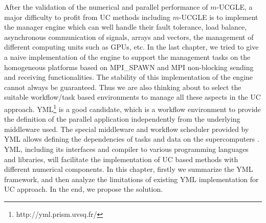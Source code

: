 \begin{displayquote}
	\textsf{After the validation of the numerical and parallel performance of $m$-UCGLE, a major difficulty to profit from UC methods including $m$-UCGLE is to implement the manager engine which can well handle their fault tolerance, load balance, asynchronous communication of signals, arrays and vectors, the management of different computing units such as GPUs, etc. In the last chapter, we tried to give a naive implementation of the engine to support the management tasks on the homogeneous platforms based on MPI\_SPAWN and MPI non-blocking sending and receiving functionalities. The stability of this implementation of the engine cannot always be guaranteed. Thus we are also thinking about to select the suitable workflow/task based environments to manage all these aspects in the UC approach. YML\footnote{http://yml.prism.uvsq.fr/} is a good candidate, which is a workflow environment to provide the definition of the parallel application independently from the underlying middleware used. The special middleware and workflow scheduler provided by YML allows defining the dependencies of tasks and data on the supercomputers \cite{delannoyyml}. YML, including its interfaces and compiler to various programming languages and libraries, will facilitate the implementation of UC based methods with different numerical components. In this chapter, firstly we summarize the YML framework, and then analyze the limitations of existing YML implementation for UC approach. In the end, we propose the solution.}
\end{displayquote}

\vspace{0.6in}


